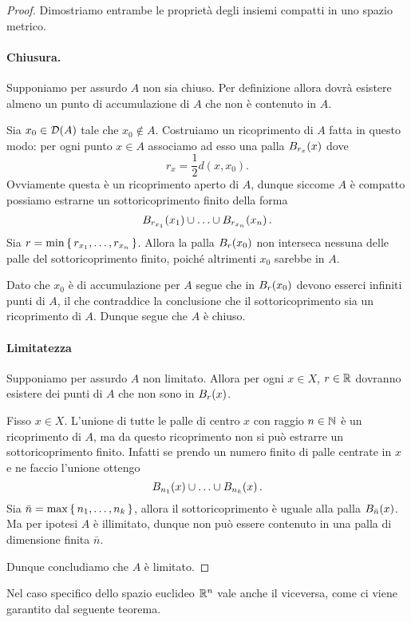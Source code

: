 \begin{proof}
    Dimostriamo entrambe le proprietà degli insiemi compatti in uno spazio metrico.
    \paragraph{Chiusura.} Supponiamo per assurdo $A$ non sia chiuso. Per definizione allora dovrà esistere almeno un punto di accumulazione di $A$ che non è contenuto in $A$.

    Sia $x_0 \in \derived{A}$ tale che $x_0 \notin A$. Costruiamo un ricoprimento di $A$ fatta in questo modo: per ogni punto $x \in A$ associamo ad esso una palla $\oB[r_x]{x}$ dove \[
        r_x = \frac12 d(x, x_0).    
    \] Ovviamente questa è un ricoprimento aperto di $A$, dunque siccome $A$ è compatto possiamo estrarne un sottoricoprimento finito della forma \[
        \oB[r_{x_1}]{x_1} \union \dots \union \oB[r_{x_n}]{x_n}.   
    \] Sia $r = \min \set{r_{x_1}, \dots, r_{x_n}}$. Allora la palla $\oB[r]{x_0}$ non interseca nessuna delle palle del sottoricoprimento finito, poiché altrimenti $x_0$ sarebbe in $A$.

    Dato che $x_0$ è di accumulazione per $A$ segue che in $\oB[r]{x_0}$ devono esserci infiniti punti di $A$, il che contraddice la conclusione che il sottoricoprimento sia un ricoprimento di $A$. Dunque segue che $A$ è chiuso.
    \paragraph{Limitatezza} Supponiamo per assurdo $A$ non limitato. Allora per ogni $x \in X$, $r \in \R$ dovranno esistere dei punti di $A$ che non sono in $\oB[r]{x}$.

    Fisso $x \in X$. L'unione di tutte le palle di centro $x$ con raggio $n \in \N$ è un ricoprimento di $A$, ma da questo ricoprimento non si può estrarre un sottoricoprimento finito. Infatti se prendo un numero finito di palle centrate in $x$ e ne faccio l'unione ottengo \[
        \oB[n_1]{x} \union \dots \union \oB[n_k]{x}.
    \] Sia $\bar n = \max \set{n_1, \dots, n_k}$, allora il sottoricoprimento è uguale alla palla $\oB[\bar n]{x}$. Ma per ipotesi $A$ è illimitato, dunque non può essere contenuto in una palla di dimensione finita $\bar n$.

    Dunque concludiamo che $A$ è limitato.
\end{proof}

Nel caso specifico dello spazio euclideo $\R^n$ vale anche il viceversa, come ci viene garantito dal seguente teorema.

